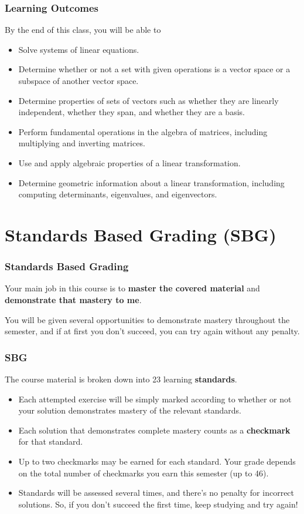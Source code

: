 \begin{frame} \frametitle{Learning Outcomes }
By the end of this class, you will be able to
\begin{itemize}
\item Solve systems of linear equations.
\pause \item Determine whether or not a set with given operations is a vector space or a subspace of another vector space.
\pause \item Determine properties of sets of vectors such as whether they are linearly independent, whether they span, and whether they are a basis.
\pause \item Perform fundamental operations in the algebra of matrices, including multiplying and inverting matrices.
\pause \item Use and apply algebraic properties of a linear transformation.
\pause \item Determine geometric information about a linear transformation, including computing determinants, eigenvalues, and eigenvectors.
\end{itemize}
\end{frame}

\section{Standards Based Grading (SBG)}
\begin{frame}\frametitle{Standards Based Grading}
Your main job in this course is to \textbf{master the covered material}
and \textbf{demonstrate that mastery to me}.

\vspace{0.2in}
\pause

You will be given several opportunities to demonstrate mastery throughout
the semester, and if
at first you don't succeed, you can try again without any penalty.
\end{frame}

\begin{frame}\frametitle{SBG}
The course material is broken down into 23 learning \textbf{standards}.
\begin{itemize}
\item Each attempted exercise will be simply marked according to whether or not
      your solution demonstrates mastery of the relevant standards.
\item Each solution that demonstrates complete mastery counts as a
      \textbf{checkmark} for that standard.
\item Up to two checkmarks may be earned for each standard. Your grade depends
      on the total number of checkmarks you earn this semester (up to 46).
\item Standards will be assessed several times, and there's no penalty for
      incorrect solutions. So, if you don't succeed the first time,
      keep studying and try again!
\end{itemize}
\end{frame}

